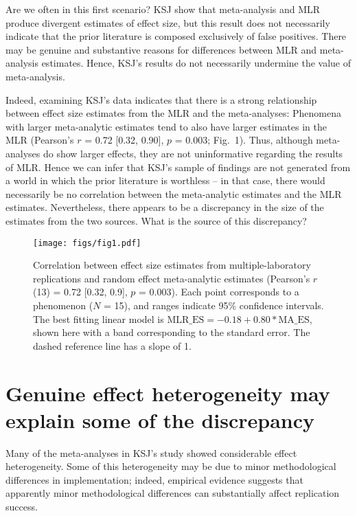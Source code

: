 \documentclass[man,floatsintext]{apa7}
\begin{document}
Are we often in this first scenario? KSJ show that meta-analysis and MLR produce divergent estimates of effect size, but this result does not necessarily indicate that the prior literature is composed exclusively of false positives. There may be genuine and substantive reasons for differences between MLR and meta-analysis estimates. Hence, KSJ's results do not necessarily undermine the value of meta-analysis.

Indeed, examining KSJ’s data indicates that there is a strong relationship between effect size estimates from the MLR and the meta-analyses: Phenomena with larger meta-analytic estimates tend to also have larger estimates in the MLR (Pearson’s $r$ = 0.72 [0.32, 0.90], $p$ = 0.003; Fig.\ 1). Thus, although meta-analyses do show larger effects, they are not uninformative regarding the results of MLR. Hence we can infer that KSJ’s sample of findings are not generated from a world in which the prior literature is worthless -- in that case, there would necessarily be no correlation between the meta-analytic estimates and the MLR estimates. Nevertheless, there appears to be a discrepancy in the size of the estimates from the two sources.  What is the source of this discrepancy? 

\begin{figure}[ht]
\centering
     \texttt{[image: figs/fig1.pdf]}
      \caption{Correlation between effect size estimates from multiple-laboratory replications and random effect meta-analytic estimates (Pearson’s $r$(13) = 0.72 [0.32, 0.9], $p$ = 0.003). Each point corresponds to a phenomenon ($N$ = 15), and ranges indicate 95\% confidence intervals. The best fitting linear model is $\text{MLR\_ES}= -0.18  +  0.80 *\text{MA\_ ES}$, shown here with a band corresponding to the standard error. The dashed reference line has a slope of 1. }
\end{figure}


\section{Genuine effect heterogeneity may explain some of the discrepancy}


Many of the meta-analyses in KSJ’s study showed considerable effect heterogeneity. Some of this heterogeneity may be due to minor methodological differences in implementation; indeed, empirical evidence suggests that apparently minor methodological differences can substantially affect replication success. 
\end{document}
